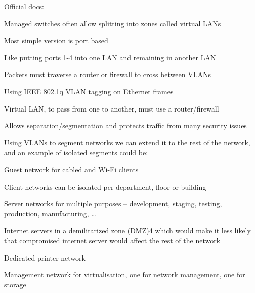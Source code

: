\documentclass[Screen16to9,17pt]{foils}
\begin{document}
Official docs:\\




\begin{list1}
\item Managed switches often allow splitting into zones called virtual LANs
\item Most simple version is port based
\item Like putting ports 1-4 into one LAN and remaining in another LAN
\item Packets must traverse a router or firewall to cross between VLANs
\end{list1}



\begin{list1}
\item Using IEEE 802.1q  VLAN tagging on Ethernet frames
\item Virtual LAN, to pass from one to another, must use a router/firewall
\item Allows separation/segmentation and protects traffic from many security issues
\end{list1}


Using VLANs to segment networks we can extend it to the rest of the network, and an example of isolated segments could be:
\begin{list2}
\item Guest network for cabled and Wi-Fi clients
\item Client networks can be isolated per department, floor or building
\item Server networks for multiple purposes – development, staging, testing, production, manufacturing, …
\item Internet servers in a demilitarized zone (DMZ)4 which would make it less likely that compromised internet
server would affect the rest of the network
\item Dedicated printer network
\item Management network for virtualisation, one for network management, one for storage
\end{list2}
\end{document}
